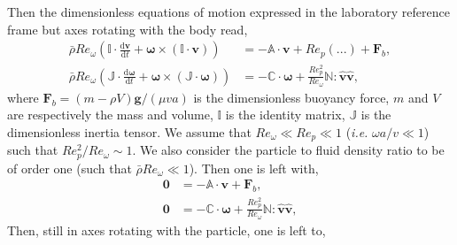 \documentclass[12pt]{My_preprint}
\begin{document}
Then the dimensionless equations of motion expressed in the laboratory reference frame but axes rotating with the body read,
\begin{align}
    \bar{\rho} Re_\omega \left(\mathbb{I}\cdot\frac{\mathrm{d}\bm v}{\mathrm{d}t} +\bm \omega \times (\mathbb{I}\cdot \bm v) \right) &= - \mathbb{A} \cdot \bm v + Re_p (...)+ \bm F_b,
    \label{eq:forcebal} \\
    \bar{\rho} Re_\omega \left(\mathbb{J}\cdot\frac{\mathrm{d}\bm \omega}{\mathrm{d}t} + \bm \omega \times (\mathbb{J}\cdot  \bm \omega)\right)  &= - \mathbb{C} \cdot \bm \omega + \frac{Re _p ^2}{Re_\omega}\mathbb{N} : \hat{\bm  v} \hat{\bm v},
    \label{eq:torquebal}
\end{align}
where $\bm F_b = (m - \rho V) \mathbf{g}/(\mu v a)$ is the dimensionless buoyancy force, $m$ and $V$ are respectively the mass and volume, $\mathbb{I}$ is the identity matrix, $\mathbb{J}$ is the dimensionless inertia tensor.
We assume that $Re_\omega \ll Re _ p \ll 1$ (\textit{i.e.} $\omega a /v \ll 1$) such that $ Re _p ^2 /Re_\omega \sim 1$.
We also consider the particle to fluid density ratio to be of order one (such that $\bar{\rho} Re_\omega \ll 1$).
Then one is left with,
\begin{align}
    \bm 0 &= - \mathbb{A} \cdot \bm v + \bm F_b,
    \label{eq:forcebal1} \\
    \bm 0 &= - \mathbb{C} \cdot \bm \omega + \frac{Re _p ^2}{Re_\omega}\mathbb{N} : \hat{\bm  v} \hat{\bm v},
    \label{eq:torquebal1}
\end{align}
Then, still in axes rotating with the particle, one is left to,
\end{document}
